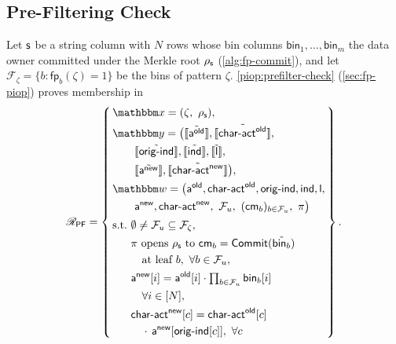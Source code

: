 \subsection{Pre-Filtering Check}
\label{sec:proof-pf}
Let $\mathsf{s}$ be a string column with $N$ rows whose bin columns $\mathsf{bin}_1,\dots,\mathsf{bin}_m$ the data owner committed under the Merkle root $\rho_{\mathsf{s}}$ (\cref{alg:fp-commit}), and let $\mathcal{F}_\zeta=\{b : \mathsf{fp}_b(\zeta)=1\}$ be the bins of pattern $\zeta$. \cref{piop:prefilter-check} (\cref{sec:fp-piop}) proves membership in
\ifsp
\begin{equation*}
\NPRelation_{\mathsf{PF}} = \left\{\,
\begin{aligned}
  & \NPInstance = (\zeta,\ \rho_\strcol),\\
  & \NPInstancey = \bigl(\Oracle{\MLE{\mathsf{a}^{\mathsf{old}}}}, \Oracle{\MLE{\mathsf{char\text{-}act}^{\mathsf{old}}}},\\
  & \qquad \Oracle{\MLE{\mathsf{orig\text{-}ind}}}, \Oracle{\MLE{\mathsf{ind}}}, \Oracle{\MLE{\mathsf{l}}},\\
  & \qquad \Oracle{\MLE{\mathsf{a}^{\mathsf{new}}}}, \Oracle{\MLE{\mathsf{char\text{-}act}^{\mathsf{new}}}}\bigr),\\
  & \NPWitness = \bigl(\mathsf{a}^{\mathsf{old}}, \mathsf{char\text{-}act}^{\mathsf{old}}, \mathsf{orig\text{-}ind}, \mathsf{ind}, \mathsf{l},\\
  & \qquad \mathsf{a}^{\mathsf{new}}, \mathsf{char\text{-}act}^{\mathsf{new}},\ \mathcal{F}_u,\ (\Commitment_b)_{b\in\mathcal{F}_u},\ \pi\bigr)\\[2pt]
  & \text{s.t.}\ \emptyset \neq \mathcal{F}_u \subseteq \mathcal{F}_\zeta,\\
  & \phantom{\text{s.t.}}\ \pi \text{ opens } \rho_\strcol \text{ to } \Commitment_b = \Commit(\MLE{\mathsf{bin}_b})\\
  & \phantom{\text{s.t.}}\ \quad \text{at leaf } b,\ \forall b\in\mathcal{F}_u,\\
  & \phantom{\text{s.t.}}\ \mathsf{a}^{\mathsf{new}}[i] = \mathsf{a}^{\mathsf{old}}[i]\cdot\textstyle\prod_{b\in\mathcal{F}_u}\mathsf{bin}_b[i]\\
  & \phantom{\text{s.t.}}\ \quad \forall i\in[N],\\
  & \phantom{\text{s.t.}}\ \mathsf{char\text{-}act}^{\mathsf{new}}[c] = \mathsf{char\text{-}act}^{\mathsf{old}}[c]\\
  & \phantom{\text{s.t.}}\ \quad \cdot\,\mathsf{a}^{\mathsf{new}}[\mathsf{orig\text{-}ind}[c]],\ \forall c
\end{aligned}
\,\right\}.
\end{equation*}
